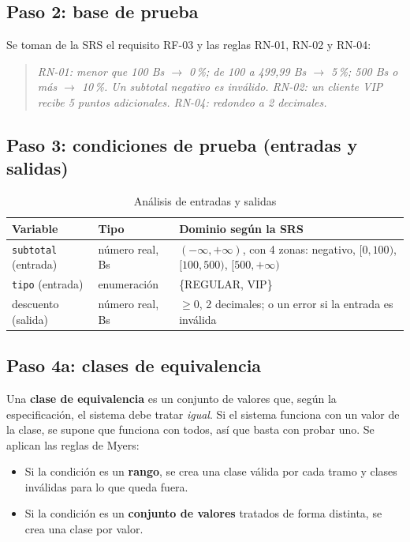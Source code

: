 \documentclass[11pt,a4paper,oneside]{report}
\newcommand{\code}[1]{\texttt{#1}}
\begin{document}
\subsection{Paso 2: base de prueba}
Se toman de la SRS el requisito RF-03 y las reglas RN-01, RN-02 y RN-04:
\begin{quote}\small\itshape
RN-01: menor que 100 Bs $\rightarrow$ 0\,\%; de 100 a 499,99 Bs $\rightarrow$ 5\,\%; 500 Bs o más $\rightarrow$ 10\,\%. Un subtotal negativo es inválido. RN-02: un cliente VIP recibe 5 puntos adicionales. RN-04: redondeo a 2 decimales.
\end{quote}

\subsection{Paso 3: condiciones de prueba (entradas y salidas)}
\begin{table}[H]
\centering
\caption{Análisis de entradas y salidas}
\small
\begin{tabularx}{\linewidth}{llX}
\toprule
\textbf{Variable} & \textbf{Tipo} & \textbf{Dominio según la SRS}\\
\midrule
\code{subtotal} (entrada) & número real, Bs & $(-\infty, +\infty)$, con 4 zonas: negativo, $[0, 100)$, $[100, 500)$, $[500, +\infty)$\\
\code{tipo} (entrada) & enumeración & \{REGULAR, VIP\}\\
descuento (salida) & número real, Bs & $\geq 0$, 2 decimales; o un error si la entrada es inválida\\
\bottomrule
\end{tabularx}
\end{table}

\subsection{Paso 4a: clases de equivalencia}
Una \textbf{clase de equivalencia} es un conjunto de valores que, según la especificación, el sistema debe tratar \emph{igual}. Si el sistema funciona con un valor de la clase, se supone que funciona con todos, así que basta con probar uno. Se aplican las reglas de Myers:
\begin{itemize}
  \item Si la condición es un \textbf{rango}, se crea una clase válida por cada tramo y clases inválidas para lo que queda fuera.
  \item Si la condición es un \textbf{conjunto de valores} tratados de forma distinta, se crea una clase por valor.
\end{itemize}
\end{document}
